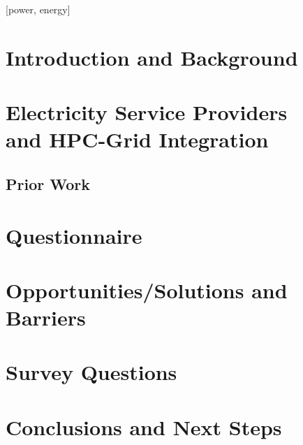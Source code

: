 \documentclass{../style/sig-alternate}
\begin{document}

[power, energy]



%
\section{Introduction and Background}

\label{sec:intro}

\section{Electricity Service Providers\\
 and HPC-Grid Integration}

\label{sec:supercomputer}

\subsection{Prior Work}

\label{sec:priorwork}

\section{Questionnaire} 

\label{sec:questionnaire}

\section{Opportunities/Solutions and\\ Barriers} 

\label{sec:opportunities}

\section{Survey Questions}

\label{sec:questions}

\section{Conclusions and Next Steps}

\label{sec:conclusion}


%
%

%

%
\end{document}
